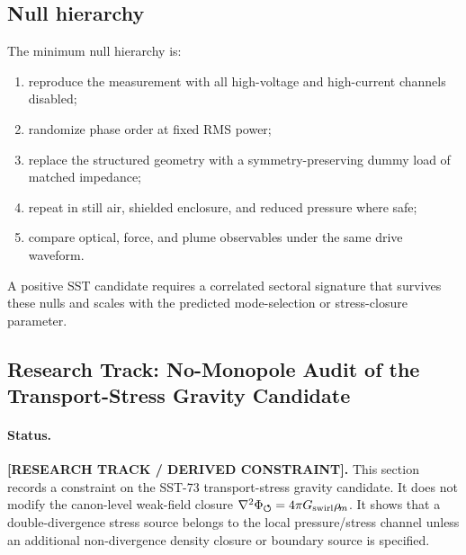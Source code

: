 \subsection{Null hierarchy}

The minimum null hierarchy is:
\begin{enumerate}
    \item reproduce the measurement with all high-voltage and high-current channels disabled;
    \item randomize phase order at fixed RMS power;
    \item replace the structured geometry with a symmetry-preserving dummy load of matched impedance;
    \item repeat in still air, shielded enclosure, and reduced pressure where safe;
    \item compare optical, force, and plume observables under the same drive waveform.
\end{enumerate}
A positive SST candidate requires a correlated sectoral signature that survives
these nulls and scales with the predicted mode-selection or stress-closure
parameter.



\subsection{Research Track: No-Monopole Audit of the Transport-Stress Gravity Candidate}
\label{sec:rt_no_monopole_transport_stress_audit}

\paragraph{Status.}
\textbf{[RESEARCH TRACK / DERIVED CONSTRAINT].}
This section records a constraint on the SST-73 transport-stress gravity
candidate.  It does not modify the canon-level weak-field closure
\(\nabla^2\Phi_{\boldsymbol{\circlearrowleft}}=4\pi G_{\mathrm{swirl}}\rho_{\!m}\).  It shows that a
double-divergence stress source belongs to the local pressure/stress channel
unless an additional non-divergence density closure or boundary source is
specified.

